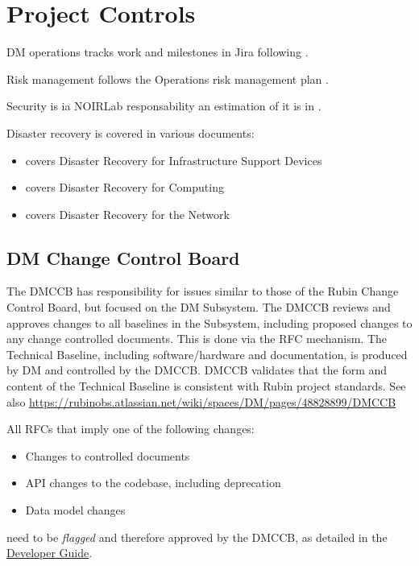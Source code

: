 \section{Project Controls} \label{sec:control}
DM operations tracks work and milestones in Jira following .

Risk management follows the Operations risk management plan .

Security is ia NOIRLab responsability an estimation of it is in \cite{RTN-030}.


Disaster recovery is covered in various documents:

\begin{itemize}
\item {} covers Disaster Recovery for Infrastructure Support Devices
\item {} covers Disaster Recovery for Computing
\item {} covers Disaster Recovery for the  Network
\end{itemize}


\subsection{DM Change Control Board \label{sect:dmccb}}

The DMCCB has responsibility for issues similar to those of the Rubin Change Control Board, but focused on the DM Subsystem.
The DMCCB reviews and approves changes to all baselines in the Subsystem, including proposed changes to any change controlled documents.
This is done via the RFC mechanism.
The Technical Baseline, including software/hardware and documentation, is produced by DM and controlled by the DMCCB.
DMCCB validates that the form and content of the Technical Baseline is consistent with Rubin project standards.
See also \url{https://rubinobs.atlassian.net/wiki/spaces/DM/pages/48828899/DMCCB}


All RFCs that imply one of the following changes:

\begin{itemize}
\item Changes to controlled documents
\item API changes to the codebase, including deprecation
\item Data model changes
\end{itemize}

need to be \textit{flagged} and therefore approved by the DMCCB, as detailed in the \href{https://developer.lsst.io/communications/rfc.html#rfc-exceptions}{Developer Guide}.

